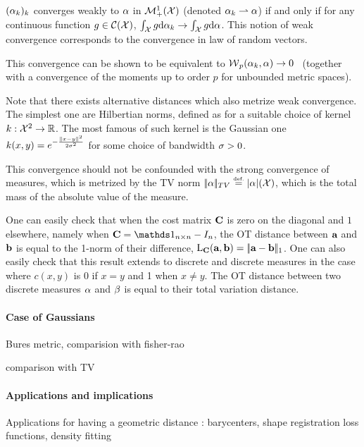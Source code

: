 \begin{defn}\label{dfn-weak-conv}
	$(\alpha_k)_k$ converges weakly to $\alpha$ in $\mathcal{M}_+^1(\mathcal{X})$ (denoted $\alpha_k \rightharpoonup \alpha$) if and only if for any continuous function $g \in \mathcal{C}(\mathcal{X})$, $\int_{\mathcal{X}} g \mathrm{d}\alpha_k \rightarrow \int_{\mathcal{X}} g \mathrm{d}\alpha$.
	This notion of weak convergence corresponds to the convergence in law of random vectors. 
\end{defn}

This convergence can be shown to be equivalent to $\operatorname{\mathcal{W}}_p(\alpha_k,\alpha) \rightarrow 0$~\cite[Theorem 6.8]{Villani09} (together with a convergence of the moments up to order $p$ for unbounded metric spaces).

Note that there exists alternative distances which also metrize weak convergence. The simplest one are Hilbertian norms, defined as
for a suitable choice of kernel $k : \mathcal{X}^2 \rightarrow \mathbb{R}$. The most famous of such kernel is the Gaussian one $k(x,y)=e^{-\frac{|\!| x-y |\!|^2}{2\sigma^2}}$ for some choice of bandwidth $\sigma>0$. 

This convergence should not be confounded with the strong convergence of measures, which is metrized by the TV norm $|\!| \alpha |\!|_{TV} \stackrel{\mbox{\upshape\tiny def.}}{=} |\alpha|(\mathcal{X})$, which is the total mass of the absolute value of the measure.





\begin{rem}\label{rem-binary}
One can easily check that when the cost matrix $\mathrm{\textbf{\upshape C}}$ is zero on the diagonal and $1$ elsewhere, namely when $\C=\ones_{n\times n}-I_n$, the OT distance between $\mathrm{\textbf{\upshape a}}$ and $\mathrm{\textbf{\upshape b}}$ is equal to the 1-norm of their difference, $\mathrm{L}_{\mathrm{\textbf{\upshape C}}}(\mathrm{\textbf{\upshape a}},\mathrm{\textbf{\upshape b}})=|\!| \mathrm{\textbf{\upshape a}}-\mathrm{\textbf{\upshape b}} |\!|_1$.
%
One can also easily check that this result extends to discrete and discrete measures in the case where $c(x,y)$ is $0$ if $x=y$ and 1 when $x\ne y$. The OT distance between two discrete measures $\alpha$ and $\beta$ is equal to their total variation distance.
\end{rem}




\paragraph{Case of Gaussians}

Bures metric, comparision with fisher-rao


 comparison with TV
 
 
\paragraph{Applications and implications}

Applications for having a geometric distance : barycenters, shape registration loss functions, density fitting